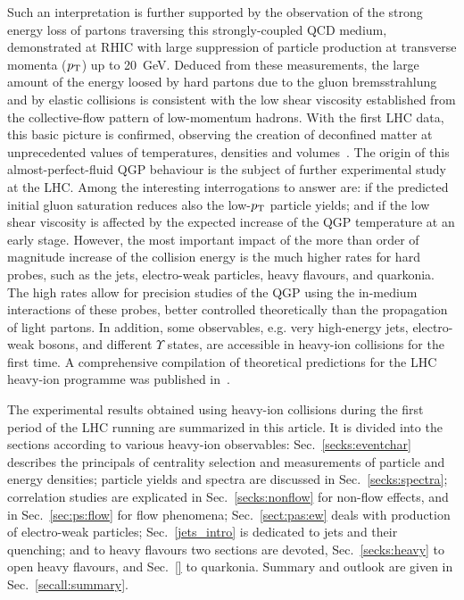 Such an interpretation is further supported by the observation of the strong energy loss of partons traversing this strongly-coupled QCD medium, demonstrated at RHIC with large suppression of particle production at transverse momenta ($p_{\rm T}$) up to 20~GeV. Deduced from these measurements, the large amount of the energy loosed by hard partons due to the gluon bremsstrahlung and by elastic collisions is consistent with the low shear viscosity established from the collective-flow pattern of low-momentum hadrons. With the first LHC data, this basic picture is confirmed, observing the creation of deconfined matter at unprecedented values of temperatures, densities and volumes~\cite{Muller:2012zq}. The origin of this almost-perfect-fluid QGP behaviour  is the subject of further experimental study at the LHC. Among the interesting interrogations to answer are: if the predicted initial gluon saturation reduces also the low-$p_{\rm T}$ particle yields; and if the low shear viscosity is affected by the expected increase of the QGP temperature at an early stage. However, the most important impact of the more than order of magnitude increase of the collision energy is the much higher rates for hard probes, such as the jets, electro-weak particles, heavy flavours, and quarkonia. The high rates allow for precision studies of the QGP using the in-medium interactions of these probes, better controlled theoretically than the propagation of light partons. In addition, some observables, e.g. very high-energy jets, electro-weak bosons, and different $\Upsilon$ states, are accessible in heavy-ion collisions for the first time. A comprehensive compilation of theoretical predictions for the LHC heavy-ion programme was published in~\cite{Abreu:2007kv}.
 
The experimental results obtained using heavy-ion collisions during the first period of the LHC running are summarized in this article. It is divided into the sections according to various heavy-ion observables: Sec.~\ref{secks:eventchar} describes the principals of centrality selection and measurements of particle and energy densities; particle yields and spectra are discussed in Sec.~\ref{secks:spectra}; correlation studies are explicated in Sec.~\ref{secks:nonflow} for non-flow effects, and in Sec.~\ref{sec:ps:flow} for flow phenomena; Sec.~\ref{sect:pas:ew} deals with production of electro-weak particles; Sec.~\ref{jets_intro} is dedicated to jets and their quenching; and to heavy flavours two sections are devoted, Sec.~\ref{secks:heavy} to open heavy flavours, and Sec.~\ref{} to quarkonia. Summary and outlook are given in Sec.~\ref{secall:summary}.

